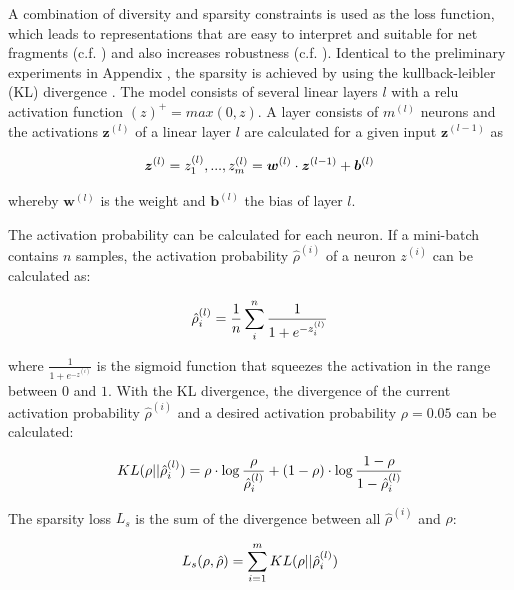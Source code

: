 A combination of diversity and sparsity constraints is used as the loss function, which leads to representations that are easy to interpret and suitable for net fragments (c.f. ) and also increases robustness (c.f. ).
Identical to the preliminary experiments in Appendix , the sparsity is achieved by using the kullback-leibler (KL) divergence .
The model consists of several linear layers $l$ with a relu activation function $(z)^+ = max(0, z)$.
A layer consists of $m^{(l)}$ neurons and the activations $\boldsymbol{z}^{(l)}$ of a linear layer $l$ are calculated for a given input $\boldsymbol{z}^{(l-1)}$ as

\begin{equation}\eqlbl{vso_1}
		\boldsymbol{z}^{(l)} = z^{(l)}_1, ..., z^{(l)}_m = \boldsymbol{w}^{(l)} \cdot \boldsymbol{z}^{(l-1)} + \boldsymbol{b}^{(l)}
\end{equation}

whereby $\boldsymbol{w}^{(l)}$ is the weight and $\boldsymbol{b}^{(l)}$ the bias of layer $l$.

The activation probability can be calculated for each neuron. If a mini-batch contains $n$ samples, the activation probability $\hat{\rho}^{(i)}$ of a neuron $z^{(i)}$ can be calculated as:

\begin{equation}\eqlbl{vso_2}
		\hat{\rho}^{(l)}_i = \frac{1}{n} \sum^n_i \frac{1}{1+e^{-z^{(l)}_i}}
\end{equation}

where $\frac{1}{1+e^{-z^{(i)}}}$ is the sigmoid function that squeezes the activation in the range between $0$ and $1$.
With the KL divergence, the divergence of the current activation probability $\hat{\rho}^{(i)}$ and a desired activation probability $\rho=0.05$ can be calculated:

\begin{equation}\eqlbl{vso_3}
		KL(\rho || \hat{\rho}^{(l)}_i) = \rho \cdot \log \frac{\rho}{\hat{\rho}^{(l)}_i} + (1-\rho) \cdot \log \frac{1-\rho}{1-\hat{\rho}^{(l)}_i}
\end{equation}

The sparsity loss $L_{s}$ is the sum of the divergence between all $\hat{\rho}^{(i)}$ and $\rho$:

\begin{equation}\eqlbl{vso_4}
		L_{s}(\rho, \hat{\rho}) = \sum_{i=1}^{m} KL(\rho || \hat{\rho}^{(l)}_i)
\end{equation}


